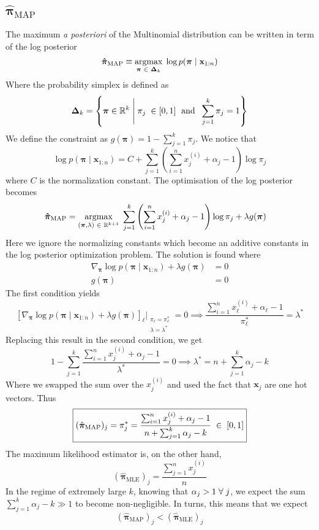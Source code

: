 \documentclass{article}
\newcommand{\s}{\hspace{0.1cm}}
\numberwithin{equation}{section}
\newcommand{\mle}[1]{\hat{#1}_{\text{MLE}}}
\begin{document}
 \subsection{$\hat{\bm{\pi}}_{\text{MAP}}  $}
 The maximum \textit{a posteriori} of the Multinomial distribution can be written in 
 term of the log posterior 
 \[
         \bm{ \hat{\pi}}_{\text{MAP}} \equiv \underset{\bm{ \pi}  \s \in \s \bm{ \Delta}_k }{\text{argmax}}
         \s
         \log p(\bm{ \pi} \mid \mathbf{x}_{1:n}) 
 \]
 Where the probability simplex is defined as 
 \[
         \bm{\Delta }_k = \left\{ \bm{ \pi}  \in \mathbb{R}^k \Biggm| \pi_j \s\in [0,1]\s 
                 \text{ and }\s \sum_{j = 1}^k \pi_j = 1 
         \right\}
 \]
 We define the constraint as $g(\bm{ \pi})= 1 - \sum_{j=1}^k \pi_j $.
 We notice that 
 \[
         \log p(\bm{ \pi} \mid \mathbf{x}_{1:n}) = C + \sum_{j = 1}^k 
         \left( \sum_{i = 1}^n x_j^{(i)} + \alpha_j - 1 \right)\log \pi_j 
 \]
where $C$ is the normalization constant. 
The optimisation of the log posterior becomes
 \begin{align*}
         \bm{ \hat{\pi}}_{\text{MAP}} &= 
         \underset{(\bm{ \pi},\lambda)  \s \in \s \mathbb{R}^{k+1} }{\text{argmax}}
         \s
         \sum_{j = 1}^k \left(\sum_{i = 1}^n x_j^{(i)} + \alpha_j - 1\right) \log\pi_j+ \lambda g(\bm{ \pi}) 
 \end{align*} 
 Here we ignore the normalizing constants which become an additive constants in the log 
 posterior optimization problem.
 The solution is found where 
 \begin{align*}
         \nabla_{\bm{ \pi}}  \log p(\bm{ \pi} \mid \mathbf{x}_{1:n} ) + \lambda g(\bm{ \pi}) &= 0 \\
         g(\bm{ \pi}) &= 0
 \end{align*} 
 The first condition yields
 \[
         \left[ \nabla_{\bm{ \pi}} 
         \log p(\bm{ \pi} \mid \mathbf{x}_{1:n} ) 
         + \lambda g(\bm{ \pi}) 
 \right]_\ell
 \bigg|_{\substack{\pi_\ell = \pi_\ell^*\\ \lambda = \lambda^*}}   = 0 
         \implies \frac{\sum_{i = 1}^n x_\ell^{(i)} + \alpha_\ell - 1}{\pi^*_\ell}
          =\lambda^*
 \]
 Replacing this result in the second condition, we get
 \[
         1 - \sum_{j = 1}^k \frac{\sum_{i = 1}^n x_j^{(i)} + \alpha_j - 1}{\lambda^*} = 0
         \implies 
         \lambda^* = n + \sum_{j = 1}^k \alpha_j - k
 \]
 Where we swapped the sum over the $x_j^{(i)}$ and used the fact that  $\mathbf{x}_j$ are 
 one hot vectors. Thus
 \[
         \boxed{(\hat{\bm{ \pi} }_{\text{MAP}} )_j = \pi^*_j = 
         \frac{\sum_{i = 1}^n x_j^{(i)} + \alpha_j - 1}{n + \sum_{j = 1}^k\alpha_j -  k}\s \in \s [0,1] }
 \]
 The maximum likelihood estimator is, on the other hand,
 \[
         (\mle{\bm{ \pi} } )_j = \frac{\sum_{j = 1}^n x_j^{(i)}}{n}
 \]
 In the regime of extremely large $k$, knowing that  $\alpha_j > 1 \s \forall \s j$, we 
 expect the sum $\sum_{j = 1}^k\alpha_j - k \gg 1$ to become non-negligible. In turns, 
 this means that we expect
  \[
          \boxed{ (\bm{ \hat{\pi}}_{\text{MAP}}  )_j < (\mle{\bm{ \pi}} )_j}
 \]
\end{document}
